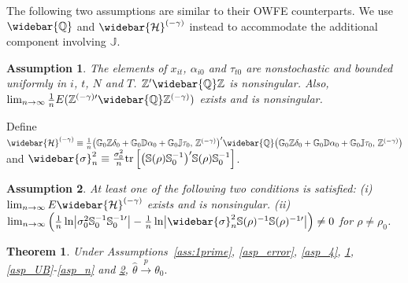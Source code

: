 \documentclass[11pt,a4paper]{article}
\newtheorem{theorem}{Theorem}
\newtheorem{passumption}{Assumption}
\begin{document}
The following two assumptions are similar to their OWFE counterparts. We use \(\widebar{\mathbb{Q}}\) and \(\widebar{\mathcal{H}}^{(-\gamma)}\) instead to accommodate the additional component involving \(\mathbb{J}\).


\setcounter{passumption}{3}
\begin{passumption}\label{ass:4prime}
The elements of $x_{it}$, $\alpha_{i0}$ and $\tau_{t0}$ are nonstochastic and bounded uniformly in $i$, $t$, $N$ and $T$. $\mathbb{Z}'\widebar{\mathbb{Q}}\mathbb{Z}$ is nonsingular. Also, $\lim_{n\to\infty}\frac{1}{n}E(\mathbb{Z}^{(-\gamma)\prime}\widebar{\mathbb{Q}}\mathbb{Z}^{(-\gamma)})$ exists and is nonsingular.
\end{passumption}

Define
$\widebar{\mathcal{H}}^{(-\gamma)}
\equiv
\frac{1}{n}
\bigl(
\mathbb{G}_0\mathbb{Z}\delta_0
+
\mathbb{G}_0\mathbb{D}\alpha_0
+
\mathbb{G}_0\mathbb{J}\tau_0,\,
\mathbb{Z}^{(-\gamma)}
\bigr)'
\widebar{\mathbb{Q}}
\bigl(
\mathbb{G}_0\mathbb{Z}\delta_0
+
\mathbb{G}_0\mathbb{D}\alpha_0
+
\mathbb{G}_0\mathbb{J}\tau_0,\,
\mathbb{Z}^{(-\gamma)}
\bigr)$
and $\widebar{\sigma}_n^2
\equiv
\frac{\sigma_0^2}{n}
\mathrm{tr}
\left[
\bigl(\mathbb{S}(\rho)\mathbb{S}_0^{-1}\bigr)'
\mathbb{S}(\rho)\mathbb{S}_0^{-1}
\right]$.


\setcounter{passumption}{7}
\begin{passumption}\label{ass:8prime}
At least one of the following two conditions is satisfied: (i) $\lim_{n\to\infty}E\widebar{\mathcal{H}}^{(-\gamma)}$ exists and is nonsingular. (ii) $\lim_{n\to\infty}
\left(
\frac{1}{n}\ln\bigl|\sigma_0^2\mathbb{S}_0^{-1}\mathbb{S}_0^{-1\prime}\bigr|
-
\frac{1}{n}\ln\bigl|\widebar{\sigma}_n^2\mathbb{S}(\rho)^{-1}\mathbb{S}(\rho)^{-1\prime}\bigr|
\right)
\neq 0
$ for $\rho \neq \rho_0$.
\end{passumption}

\begin{theorem}
Under Assumptions~\ref{ass:1prime}, \ref{asp_error}, \ref{asp_4}, \ref{ass:4prime}, \ref{asp_UB}-\ref{asp_n} and \ref{ass:8prime},
$\hat{\theta}\xrightarrow{p}\theta_0.$
\end{theorem}
\end{document}
